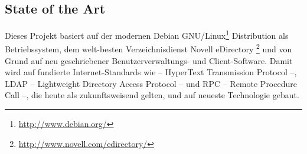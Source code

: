 \subsection*{State of the Art}
Dieses Projekt basiert auf der modernen Debian GNU/Linux\footnote{\url{http://www.debian.org/} } Distribution als Betriebssystem, dem welt-besten Verzeichnisdienst Novell eDirectory \footnote{\url{http://www.novell.com/edirectory/} } und von Grund auf neu geschriebener Benutzerverwaltungs- und Client-Software. 
Damit wird auf fundierte Internet-Standards wie  -- HyperText Transmission Protocol --, LDAP -- Lightweight Directory Access Protocol -- und RPC -- Remote Procedure Call --, die heute als zukunftsweisend gelten, und auf neueste Technologie gebaut.


